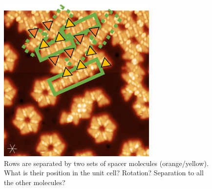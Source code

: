 \begin{figure}[] \centering
	\includegraphics[width=0.7\textwidth]{./images/hbbnc-ag-111-rt-med-coverage-spacer-mol}
	\caption{Rows are separated by two sets of spacer molecules (orange/yellow). 
		What is their position in the unit cell? Rotation? Separation to all the other molecules? }
	\label{}
\end{figure}

